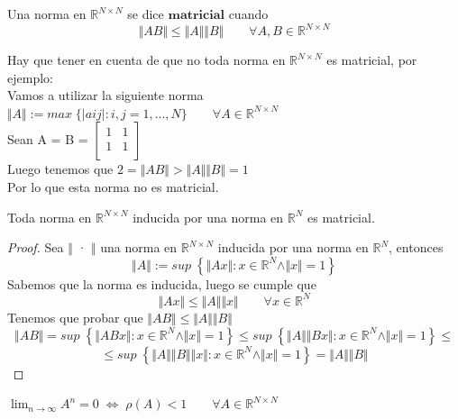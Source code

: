 \begin{ndef}
Una norma en $\mathbb{R}^{N \times N}$ se dice $\textbf{matricial}$ cuando
\[ \Vert AB \Vert \leq \Vert A \Vert \Vert B \Vert \qquad \forall A,B \in \mathbb{R}^{N \times N} \]
\end{ndef}

Hay que tener en cuenta de que no toda norma en $\mathbb{R}^{N \times N}$ es matricial, por ejemplo:\\
Vamos a utilizar la siguiente norma\\
$\Vert A \Vert := max \; \lbrace \vert a{ij} \vert : i, j = 1,...,N \rbrace \qquad \forall A \in \mathbb{R}^{N \times N}$ \\
Sean A = B = $\begin{bmatrix}
1 & 1 \\
1 & 1 \\
\end{bmatrix}$\\
Luego tenemos que
$2 = \Vert AB \Vert > \Vert A \Vert \Vert B \Vert = 1$\\
Por lo que esta norma no es matricial.\\

\begin{nprop}
Toda norma en $\mathbb{R}^{N \times N}$ inducida por una norma en $\mathbb{R}^N$ es matricial.
\end{nprop}

\begin{proof}
Sea $\Vert$ · $\Vert$ una norma en $\mathbb{R}^{N \times N}$ inducida por una norma en $\mathbb{R}^N$, entonces
\[ \Vert A \Vert := sup \; \left\lbrace \Vert Ax \Vert : x \in \mathbb{R}^N \wedge \Vert x \Vert = 1 \right\rbrace \]
Sabemos que la norma es inducida, luego se cumple que
\[ \Vert Ax \Vert \leq \Vert A \Vert \Vert x \Vert \qquad \forall x \in \mathbb{R}^N \]
Tenemos que probar que $\Vert AB \Vert \leq \Vert A \Vert \Vert B \Vert$\\
\[ \Vert AB \Vert = sup \; \left\lbrace \Vert ABx \Vert : x \in \mathbb{R}^N \wedge \Vert x \Vert = 1 \right\rbrace \leq sup \; \left\lbrace \Vert A \Vert \Vert Bx \Vert : x \in \mathbb{R}^N \wedge \Vert x \Vert = 1 \right\rbrace \leq \] \[ \leq sup \; \left\lbrace \Vert A \Vert \Vert B \Vert \Vert x \Vert : x \in \mathbb{R}^N \wedge \Vert x \Vert = 1 \right\rbrace = \Vert A \Vert \Vert B \Vert \]
\end{proof}

\begin{nth}
$\lim_{n \rightarrow \infty} A^n = 0 \; \Leftrightarrow \; \rho (A) < 1 \qquad \forall A \in \mathbb{R}^{N \times N} $
\end{nth}

